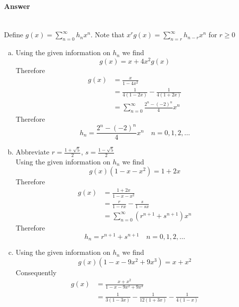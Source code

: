 \documentclass[UTF8]{article}
\begin{document}
\paragraph{Answer}
~\\
Define $ g(x) = \sum_{n = 0}^{\infty}h_{n}x^{n} $. Note that $ x^{r}g(x) = \sum_{n = r}^{\infty}h_{n - r}x^{n} $ for $ r \geq 0 $
\begin{enumerate}[(a)]
    \item Using the given information on $ h_{n} $ we find
          $$ g(x)  = x + 4x^{2}g(x) $$
          Therefore
          \begin{equation}
          \begin{aligned}
          g(x) &= \frac{x}{1 - 4x^{2}} \\
          &= \frac{1}{4(1 - 2x)} - \frac{1}{4(1 + 2x)} \\
          &= \sum_{n = 0}^\infty \frac{2^{n} - {(-2)}^{n}}{4} x^{n}
          \nonumber
          \end{aligned}
          \end{equation}
          Therefore
          $$ h_{n} = \frac{2^{n} - {(-2)}^{n}}{4} x^{n} \quad n=0,1,2, \dots $$
    \item Abbreviate $ r = \frac{1 + \sqrt{5}}{2} $, \quad $ s = \frac{1 - \sqrt{5}}{2} $ \\
          Using the given information on $ h_{n} $ we find
          $$ g(x)(1 - x - x^2)  = 1 + 2x $$
          Therefore
          \begin{equation}
          \begin{aligned}
          g(x) &= \frac{1 + 2x}{1 - x - x^2} \\
          &= \frac{r}{1 - rx} - \frac{s}{1 - sx} \\
          &= \sum_{n = 0}^\infty (r^{n + 1} + s^{n + 1}) x^{n}
          \nonumber
          \end{aligned}
          \end{equation}
          Therefore
          $$ h_{n} = r^{n + 1} + s^{n + 1} \quad n=0,1,2, \dots $$
    \item Using the given information on $ h_{n} $ we find
          $$ g(x)(1 -x - 9x^2 + 9x^3)  = x + x^2 $$
          Consequently
          \begin{equation}
          \begin{aligned}
          g(x) &= \frac{x + x^2}{1 -x - 9x^2 + 9x^3} \\
          &= \frac{1}{3(1 - 3x)} - \frac{1}{12(1 + 3x)} - \frac{1}{4(1 - x)} \\

\end{aligned}
\end{equation}
\end{enumerate}
\end{document}
